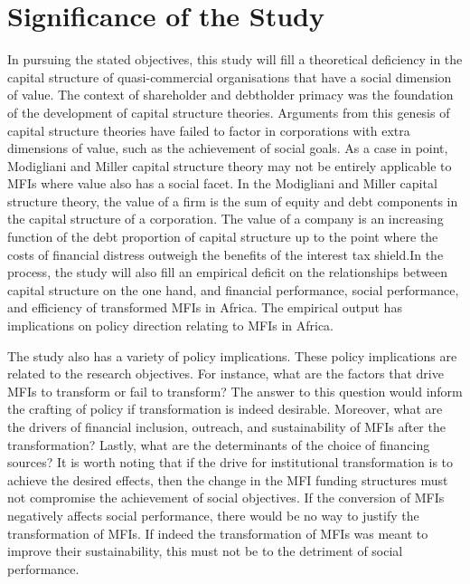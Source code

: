 \documentclass[a4paper, nobind]{templates/ociamthesis}
\begin{document}
\hypertarget{significance-of-the-study}{%
\section{Significance of the Study}\label{significance-of-the-study}}

\noindent In pursuing the stated objectives, this study will fill a theoretical deficiency in the capital structure of quasi-commercial organisations that have a social dimension of value. The context of shareholder and debtholder primacy was the foundation of the development of capital structure theories. Arguments from this genesis of capital structure theories have failed to factor in corporations with extra dimensions of value, such as the achievement of social goals. As a case in point, Modigliani and Miller capital structure theory may not be entirely applicable to MFIs where value also has a social facet. In the Modigliani and Miller capital structure theory, the value of a firm is the sum of equity and debt components in the capital structure of a corporation. The value of a company is an increasing function of the debt proportion of capital structure up to the point where the costs of financial distress outweigh the benefits of the interest tax shield.In the process, the study will also fill an empirical deficit on the relationships between capital structure on the one hand, and financial performance, social performance, and efficiency of transformed MFIs in Africa. The empirical output has implications on policy direction relating to MFIs in Africa.

The study also has a variety of policy implications. These policy implications are related to the research objectives. For instance, what are the factors that drive MFIs to transform or fail to transform? The answer to this question would inform the crafting of policy if transformation is indeed desirable. Moreover, what are the drivers of financial inclusion, outreach, and sustainability of MFIs after the transformation? Lastly, what are the determinants of the choice of financing sources? It is worth noting that if the drive for institutional transformation is to achieve the desired effects, then the change in the MFI funding structures must not compromise the achievement of social objectives. If the conversion of MFIs negatively affects social performance, there would be no way to justify the transformation of MFIs. If indeed the transformation of MFIs was meant to improve their sustainability, this must not be to the detriment of social performance.
\end{document}
